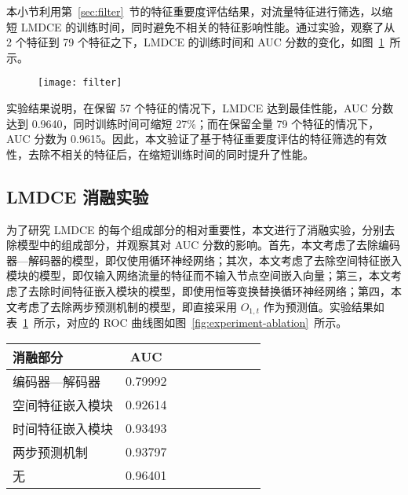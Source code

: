 {本小节利用第~\ref{sec:filter}~节的特征重要度评估结果，对流量特征进行筛选，以缩短 LMDCE 的训练时间，同时避免不相关的特征影响性能。通过实验，观察了从 2 个特征到 79 个特征之下，LMDCE 的训练时间和 AUC 分数的变化，如图~\ref{fig:experiment-filter}~所示。

\begin{figure}[t]
    \centering
    \texttt{[image: filter]}
    \label{fig:experiment-filter}

\end{figure}

实验结果说明，在保留 57 个特征的情况下，LMDCE 达到最佳性能，AUC 分数达到 0.9640，同时训练时间可缩短 27\%；而在保留全量 79 个特征的情况下，AUC 分数为 0.9615。因此，本文验证了基于特征重要度评估的特征筛选的有效性，去除不相关的特征后，在缩短训练时间的同时提升了性能。

\subsection{LMDCE 消融实验}

为了研究 LMDCE 的每个组成部分的相对重要性，本文进行了消融实验，分别去除模型中的组成部分，并观察其对 AUC 分数的影响。首先，本文考虑了去除编码器—解码器的模型，即仅使用循环神经网络；其次，本文考虑了去除空间特征嵌入模块的模型，即仅输入网络流量的特征而不输入节点空间嵌入向量；第三，本文考虑了去除时间特征嵌入模块的模型，即使用恒等变换替换循环神经网络；第四，本文考虑了去除两步预测机制的模型，即直接采用 $O_{1,t}$ 作为预测值。实验结果如表~\ref{tab:experiment-ablation}~所示，对应的 ROC 曲线图如图~\ref{fig:experiment-ablation}~所示。

\begin{table}[t]
    \label{tab:experiment-ablation}
    \centering
    \footnotesize%
    \setlength{\tabcolsep}{4pt}%
    \renewcommand{\arraystretch}{1.2}%
    \begin{tabular}{lcccccccc}
        \hline
        消融部分 & AUC\\
        \hline
        编码器—解码器 & 0.79992\\
        空间特征嵌入模块 & 0.92614\\
        时间特征嵌入模块 & 0.93493\\
        两步预测机制 & 0.93797\\
        无 & 0.96401\\
        \hline
    \end{tabular}
\end{table}

}
